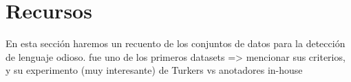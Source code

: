 \section{Recursos}

En esta sección haremos un recuento de los conjuntos de datos para la detección de lenguaje odioso.
\citet{nobata2016abusive} fue uno de los primeros datasets => mencionar sus criterios, y su experimento (muy interesante) de Turkers vs anotadores in-house



\citet{gao2018detecting}





